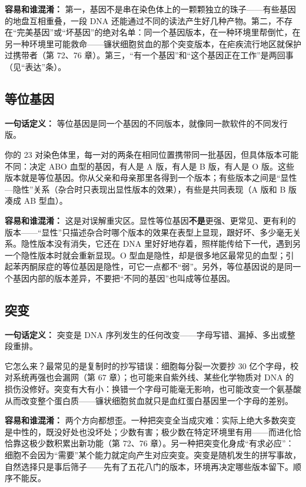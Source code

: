 \textbf{容易和谁混淆：} 第一，基因不是串在染色体上的一颗颗独立的珠子——有些基因的地盘互相重叠，一段 DNA 还能通过不同的读法产生好几种产物。第二，不存在“完美基因”或“坏基因”的绝对名单：同一个基因版本，在一种环境里帮倒忙，在另一种环境里可能救命——镰状细胞贫血的那个突变版本，在疟疾流行地区就保护过携带者（第 72、76 章）。第三，“有一个基因”和“这个基因正在工作”是两回事（见“表达”条）。

\subsection{等位基因}

\textbf{一句话定义：} 等位基因是同一个基因的不同版本，就像同一款软件的不同发行版。

你的 23 对染色体里，每一对的两条在相同位置携带同一批基因，但具体版本可能不同：决定 ABO 血型的基因，有人是 A 版，有人是 B 版，有人是 O 版。这些版本就是等位基因。你从父亲和母亲那里各得到一个版本；有些版本之间是“显性—隐性”关系（杂合时只表现出显性版本的效果），有些是共同表现（A 版和 B 版凑成 AB 型血）。

\textbf{容易和谁混淆：} 这是对误解重灾区。显性等位基因\textbf{不是}更强、更常见、更有利的版本——“显性”只描述杂合时哪个版本的效果在表型上显现，跟好坏、多少毫无关系。隐性版本没有消失，它还在 DNA 里好好地存着，照样能传给下一代，遇到另一个隐性版本时就会重新显现。O 型血是隐性，却是很多地区最常见的血型；引起苯丙酮尿症的等位基因是隐性，可它一点都不“弱”。另外，等位基因说的是同一个基因内部的版本差异，不要把“不同的基因”也叫成等位基因。

\subsection{突变}

\textbf{一句话定义：} 突变是 DNA 序列发生的任何改变——字母写错、漏掉、多出或整段重排。

它怎么来？最常见的是复制时的抄写错误：细胞每分裂一次要抄 30 亿个字母，校对系统再强也会漏网（第 67 章）；也可能来自紫外线、某些化学物质对 DNA 的损伤没修好。突变有大有小：换错一个字母可能毫无影响，也可能改变一个氨基酸从而改变整个蛋白质——镰状细胞贫血就只是血红蛋白基因里一个字母的差别。

\textbf{容易和谁混淆：} 两个方向都想歪。一种把突变全当成灾难：实际上绝大多数突变是中性的，既没好处也没坏处；少数有害；极少数在特定环境里有用——而进化恰恰靠这极少数积累出新功能（第 72、76 章）。另一种把突变化身成“有求必应”：细胞不会因为“需要”某个能力就定向产生对应突变。突变是随机发生的拼写事故，自然选择只是事后筛子——先有了五花八门的版本，环境再决定哪些版本留下。顺序不能反。

